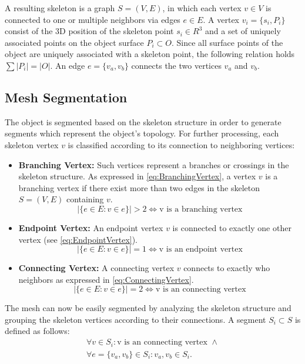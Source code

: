 A resulting skeleton is a graph $S = (V,E)$, in which each vertex $v \in V$ is connected to one or multiple neighbors via edges $e \in E$.
A vertex $v_i = \{s_i, P_i\}$ consist of the 3D position of the skeleton point $s_i \in R^3$ and a set of uniquely associated points on the object surface $P_i \subset O$.
Since all surface points of the object are uniquely associated with a skeleton point, the following relation holds $\sum{|P_i|} = |O|$.
An edge $e = \{v_a, v_b\}$ connects the two vertices $v_a$ and $v_b$.

\subsection{Mesh Segmentation}
\label{sec-segmentation}

The object is segmented based on the skeleton structure in order to generate segments which represent the object's topology. For further processing, each skeleton vertex $v$ is classified according to its connection to neighboring vertices:
\begin{itemize}
	\item \textbf{Branching Vertex:} Such vertices represent a branches or crossings in the skeleton structure. As expressed in \autoref{eq:BranchingVertex}, a vertex $v$ is a branching vertex if there exist more than two edges in the skeleton $S=(V,E)$ containing $v$.
	\begin{equation}
	|\{e \in E: v \in e\}|>2 \Leftrightarrow \text{v is a branching vertex}
	\label{eq:BranchingVertex}
	\end{equation}
	\item \textbf{Endpoint Vertex:} An endpoint vertex $v$ is connected to exactly one other vertex (see \autoref{eq:EndpointVertex}).
	\begin{equation}
	|\{e \in E: v \in e\}| = 1  \Leftrightarrow \text{v is an endpoint vertex}
	\label{eq:EndpointVertex}
	\end{equation}
	\item \textbf{Connecting Vertex:} A connecting vertex $v$ connects to exactly who neighbors as expressed in \autoref{eq:ConnectingVertex}.
	\begin{equation}
	|\{e \in E: v \in e\}| = 2  \Leftrightarrow \text{v is an connecting vertex}
	\label{eq:ConnectingVertex}
	\end{equation}
\end{itemize}

The mesh can now be easily segmented by analyzing the skeleton structure and grouping the skeleton vertices according to their connections. 
A segment $S_i \subset S$ is defined as follows:
\begin{equation}
\begin{split}
	\forall v \in S_i: \text{v is an connecting vertex}\,\,\wedge \\
	\forall e=\{v_a,v_b\} \in S_i: v_a, v_b \in S_i.
\end{split}
\label{eq:Segment}
\end{equation}

